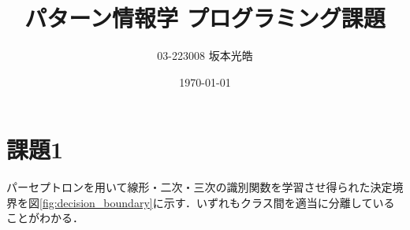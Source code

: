 \documentclass[a4paper,12pt]{jsarticle}
\title{パターン情報学 プログラミング課題}
\author{03-223008 坂本光皓}
\date{\today}
\begin{document}
\maketitle

\section{課題1}
パーセプトロンを用いて線形・二次・三次の識別関数を学習させ得られた決定境界を図\ref{fig:decision_boundary}に示す．いずれもクラス間を適当に分離していることがわかる．
\end{document}
